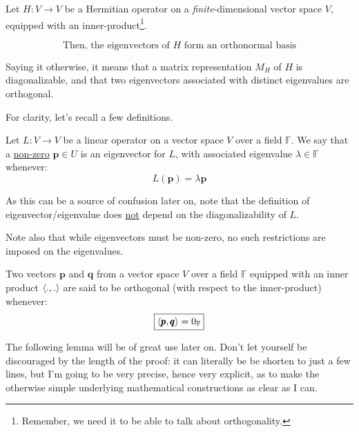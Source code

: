 \documentclass[solutions.tex]{subfiles}
\renewcommand{\bm}[1]{\pmb{#1}}
\begin{document}
\begin{theorem} Let $H : V \rightarrow V$ be a Hermitian operator on a
\textit{finite}-dimensional vector space $V$, equipped with an
inner-product\footnote{Remember, we need it to be able to talk
about orthogonality.}.

\[
	\boxed{\text{Then, the eigenvectors of $H$ form an orthonormal basis}}
\]

Saying it otherwise, it means that a matrix representation $M_H$ of $H$
is diagonalizable, and that two eigenvectors associated with distinct
eigenvalues are orthogonal.
\end{theorem}

For clarity, let's recall a few definitions.

\begin{definition} Let $L : V \rightarrow V$ be a linear operator
on a vector space $V$ over a field $\mathbb{F}$.
We say that a \underline{non-zero} $\bm{p}\in U$ is an eigenvector for $L$,
with associated eigenvalue $\lambda\in\mathbb{F}$ whenever:
\[
	L(\bm{p}) = \lambda\bm{p}
\]
\end{definition}

\begin{remark} As this can be a source of confusion later on, note
that the definition of eigenvector/eigenvalue does \underline{not}
depend on the diagonalizability of $L$.
\end{remark}

\begin{remark} Note also that while eigenvectors must be
non-zero, no such restrictions are imposed on the eigenvalues.
\end{remark}

\begin{definition} Two vectors $\bm{p}$ and $\bm{q}$ from
a vector space $V$ over a field $\mathbb{F}$ equipped with
an inner product $\left\langle . , . \right\rangle$ are said to be orthogonal
(with respect to the inner-product) whenever:
\[
	\boxed{\innerprod{\bm{p}}{\bm{q}} = 0_{\mathbb{F}}}
\]
\end{definition}

The following lemma will be of great use later on. Don't
let yourself be discouraged by the length of the proof: it can
literally be be shorten to just a few lines, but I'm going to
be very precise, hence very explicit, as to make the otherwise
simple underlying mathematical constructions as clear as I can.
\end{document}
